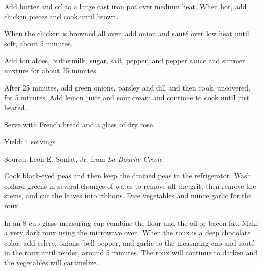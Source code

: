 \documentclass[letterpaper]{recipePMG}
\begin{document}
Add butter and oil to a large cast iron pot over medium heat.  When hot, add chicken pieces and cook until brown.  

When the chicken is browned all over, add onion and saut\'{e} over low heat until soft, about 5 minutes.

Add tomatoes, buttermilk, sugar, salt, pepper, and pepper sauce and simmer mixture for about 25 minutes.

After 25 minutes, add green onions, parsley and dill and then cook, uncovered, for 5 minutes.  Add lemon juice and sour cream and continue to cook until just heated.

Serve with French bread and a glass of dry rose. 

Yield: 4 servings

Source: Leon E. Soniat, Jr. from \textit{La Bouche Creole}



\newpage
{}


Cook black-eyed peas and then keep the drained peas in the refrigerator. Wash collard greens in several changes of water to remove all the grit, then remove the stems, and cut the leaves into ribbons. Dice vegetables and mince garlic for the roux.

In an 8-cup glass measuring cup combine the flour and the oil or bacon fat.  Make a very dark roux using the microwave oven. When the roux is a deep chocolate color, add celery, onions, bell pepper, and garlic to the measuring cup and saut\'{e} in the roux until tender, around 5 minutes. The roux will continue to darken and the vegetables will caramelize.
 
\end{document}
